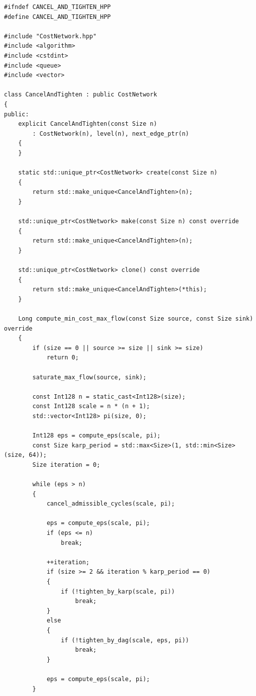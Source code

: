 \newpage

\label{ap:cancel_and_tighten}

\begin{lstlisting}[caption={Implementação em C++ do algoritmo \textit{Cancel-and-Tighten} com ordenação topológica em DAG admissível e aperto via algoritmo de Karp.}, label={lst:cancel_and_tighten}]
#ifndef CANCEL_AND_TIGHTEN_HPP
#define CANCEL_AND_TIGHTEN_HPP

#include "CostNetwork.hpp"
#include <algorithm>
#include <cstdint>
#include <queue>
#include <vector>

class CancelAndTighten : public CostNetwork
{
public:
	explicit CancelAndTighten(const Size n)
	    : CostNetwork(n), level(n), next_edge_ptr(n)
	{
	}

	static std::unique_ptr<CostNetwork> create(const Size n)
	{
		return std::make_unique<CancelAndTighten>(n);
	}

	std::unique_ptr<CostNetwork> make(const Size n) const override
	{
		return std::make_unique<CancelAndTighten>(n);
	}

	std::unique_ptr<CostNetwork> clone() const override
	{
		return std::make_unique<CancelAndTighten>(*this);
	}

	Long compute_min_cost_max_flow(const Size source, const Size sink) override
	{
		if (size == 0 || source >= size || sink >= size)
			return 0;

		saturate_max_flow(source, sink);

		const Int128 n = static_cast<Int128>(size);
		const Int128 scale = n * (n + 1);
		std::vector<Int128> pi(size, 0);

		Int128 eps = compute_eps(scale, pi);
		const Size karp_period = std::max<Size>(1, std::min<Size>(size, 64));
		Size iteration = 0;

		while (eps > n)
		{
			cancel_admissible_cycles(scale, pi);

			eps = compute_eps(scale, pi);
			if (eps <= n)
				break;

			++iteration;
			if (size >= 2 && iteration % karp_period == 0)
			{
				if (!tighten_by_karp(scale, pi))
					break;
			}
			else
			{
				if (!tighten_by_dag(scale, eps, pi))
					break;
			}

			eps = compute_eps(scale, pi);
		}


\end{lstlisting}
